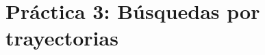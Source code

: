 \documentclass[11pt,twoside,titlepage,a4paper]{book}
\numberwithin{equation}{section} %
\theoremstyle{usual}
\begin{document}

 





\chapter{Práctica 3: Búsquedas por trayectorias}

\end{document}

